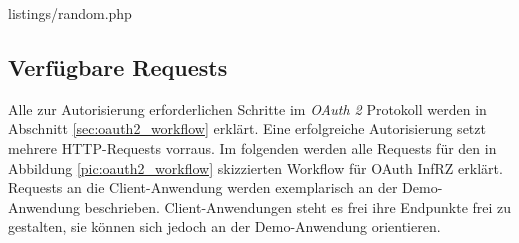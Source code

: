 \documentclass[12pt,a4paper,pointednumbers,abstracton]{scrartcl}
\begin{document}
\begin{minipage}{\textwidth}
	
	{listings/random.php}
\end{minipage}

\subsection{Verfügbare Requests}

Alle zur Autorisierung erforderlichen Schritte im \emph{OAuth 2} Protokoll werden in Abschnitt \ref{sec:oauth2_workflow} erklärt.
Eine erfolgreiche Autorisierung setzt mehrere HTTP-Requests vorraus.
Im folgenden werden alle Requests für den in Abbildung \ref{pic:oauth2_workflow} skizzierten Workflow für OAuth InfRZ erklärt.
Requests an die Client-Anwendung werden exemplarisch an der Demo-Anwendung beschrieben.
Client-Anwendungen steht es frei ihre Endpunkte frei zu gestalten, sie können sich jedoch an der Demo-Anwendung orientieren.
\end{document}
